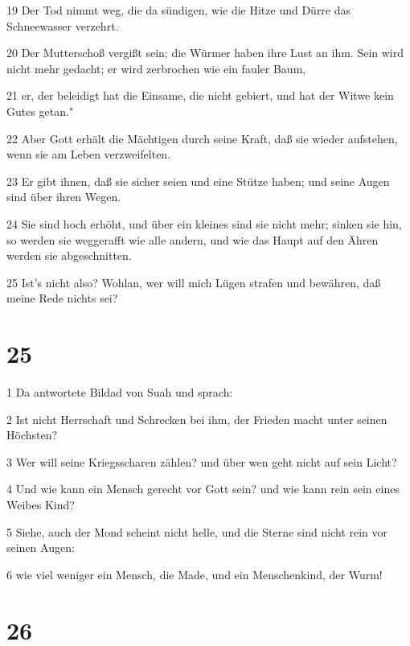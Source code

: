 \par 19 Der Tod nimmt weg, die da sündigen, wie die Hitze und Dürre das Schneewasser verzehrt.
\par 20 Der Mutterschoß vergißt sein; die Würmer haben ihre Lust an ihm. Sein wird nicht mehr gedacht; er wird zerbrochen wie ein fauler Baum,
\par 21 er, der beleidigt hat die Einsame, die nicht gebiert, und hat der Witwe kein Gutes getan."
\par 22 Aber Gott erhält die Mächtigen durch seine Kraft, daß sie wieder aufstehen, wenn sie am Leben verzweifelten.
\par 23 Er gibt ihnen, daß sie sicher seien und eine Stütze haben; und seine Augen sind über ihren Wegen.
\par 24 Sie sind hoch erhöht, und über ein kleines sind sie nicht mehr; sinken sie hin, so werden sie weggerafft wie alle andern, und wie das Haupt auf den Ähren werden sie abgeschnitten.
\par 25 Ist's nicht also? Wohlan, wer will mich Lügen strafen und bewähren, daß meine Rede nichts sei?

\chapter{25}

\par 1 Da antwortete Bildad von Suah und sprach:
\par 2 Ist nicht Herrschaft und Schrecken bei ihm, der Frieden macht unter seinen Höchsten?
\par 3 Wer will seine Kriegsscharen zählen? und über wen geht nicht auf sein Licht?
\par 4 Und wie kann ein Mensch gerecht vor Gott sein? und wie kann rein sein eines Weibes Kind?
\par 5 Siehe, auch der Mond scheint nicht helle, und die Sterne sind nicht rein vor seinen Augen:
\par 6 wie viel weniger ein Mensch, die Made, und ein Menschenkind, der Wurm!

\chapter{26}

